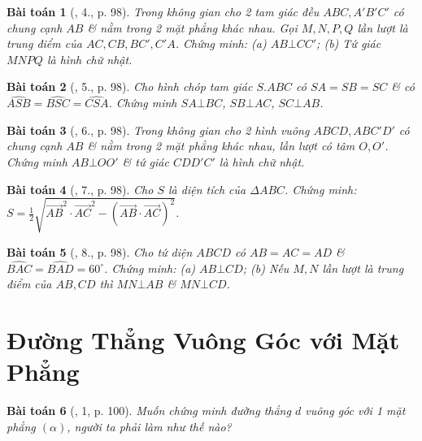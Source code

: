 \documentclass{article}
\numberwithin{equation}{section}
\newtheorem{baitoan}{Bài toán}
\begin{document}
\begin{baitoan}[\cite{SGK_Toan_11_hinh_hoc_co_ban}, 4., p. 98]
	Trong không gian cho 2 tam giác đều $ABC,A'B'C'$ có chung cạnh $AB$ \& nằm trong 2 mặt phẳng khác nhau. Gọi $M,N,P,Q$ lần lượt là trung điểm của $AC,CB,BC',C'A$. Chứng minh: (a) $AB\bot CC'$; (b) Tứ giác $MNPQ$ là hình chữ nhật.
\end{baitoan}

\begin{baitoan}[\cite{SGK_Toan_11_hinh_hoc_co_ban}, 5., p. 98]
	Cho hình chóp tam giác $S.ABC$ có $SA = SB = SC$ \& có $\widehat{ASB} = \widehat{BSC} = \widehat{CSA}$. Chứng minh $SA\bot BC$, $SB\bot AC$, $SC\bot AB$.
\end{baitoan}

\begin{baitoan}[\cite{SGK_Toan_11_hinh_hoc_co_ban}, 6., p. 98]
	Trong không gian cho 2 hình vuông $ABCD,ABC'D'$ có chung cạnh $AB$ \& nằm trong 2 mặt phẳng khác nhau, lần lượt có tâm $O,O'$. Chứng minh $AB\bot OO'$ \& tứ giác $CDD'C'$ là hình chữ nhật.
\end{baitoan}

\begin{baitoan}[\cite{SGK_Toan_11_hinh_hoc_co_ban}, 7., p. 98]
	Cho $S$ là diện tích của $\Delta ABC$. Chứng minh: $S = \frac{1}{2}\sqrt{\overrightarrow{AB}^2\cdot\overrightarrow{AC}^2 - (\overrightarrow{AB}\cdot\overrightarrow{AC})^2}$.
\end{baitoan}

\begin{baitoan}[\cite{SGK_Toan_11_hinh_hoc_co_ban}, 8., p. 98]
	Cho tứ diện $ABCD$ có $AB = AC = AD$ \& $\widehat{BAC} = \widehat{BAD} = 60^\circ$. Chứng minh: (a) $AB\bot CD$; (b) Nếu $M,N$ lần lượt là trung điểm của $AB,CD$ thì $MN\bot AB$ \& $MN\bot CD$.
\end{baitoan}


\section{Đường Thẳng Vuông Góc với Mặt Phẳng}

\begin{baitoan}[\cite{SGK_Toan_11_hinh_hoc_co_ban}, 1, p. 100]
	Muốn chứng minh đường thẳng $d$ vuông góc với 1 mặt phẳng $(\alpha)$, người ta phải làm như thế nào?
\end{baitoan}
\end{document}
